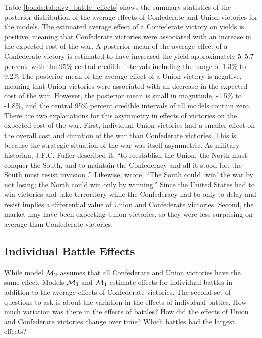 Table \ref{bonds:tab:avg_battle_effects} shows the summary statistics of the posterior distribution of the average effects of Confederate and Union victories for the models.
The estimated average effect of a Confederate victory on yields is positive, meaning that Confederate victories were associated with an increase in the expected cost of the war.
A posterior mean of the average effect of a Confederate victory is estimated to have increased the yield approximately 5--5.7 percent, with the 95\% central credible intervals including the range of 1.3\% to 9.2\%
The posterior mean of the average effect of a Union victory is negative, meaning that Union victories were associated with an decrease in the expected cost of the war.
However, the posterior mean is small in magnitude, -1.5\% to -1.8\%, and the central 95\% percent credible intervals of all models contain zero.
There are two explanations for this asymmetry in effects of victories on the expected cost of the war.
First, individual Union victories had a smaller effect on the overall cost and duration of the war than Confederate victories.
This is because the strategic situation of the war was itself asymmetric. 
As military historian, J.F.C. Fuller described it, ``to reestablish the Union, the North must conquer the South, and to maintain the Confederacy and all it stood for, the South must resist invasion \parencite[177]{Fuller1942a}.'' 
Likewise, \textcite[336]{McPherson2003} wrote, ``The South could `win' the war by not losing; the North could win only by winning.''
Since the United States had to win victories and take terroritory while the Confederacy had to only to delay and resist implies a differential value of Union and Confederate victories.
Second, the market may have been expecting Union victories, so they were less surprising on average than Confederate victories.


\subsection{Individual Battle Effects}
\label{sec:indiv-effects-battl}

While model $\mathcal{M}_{\text{2}}$ assumes that all Confederate and Union victories have the same effect, Models $\mathcal{M}_{\text{3}}$ and $\mathcal{M}_{\text{4}}$ estimate effects for individual battles in addition to the average effects of Confederate victories.
The second set of questions to ask is about the variation in the effects of individual battles.
How much variation was there in the effects of battles? 
How did the  effects of Union and Confederate victories change over time?
Which battles had the largest effects? 

